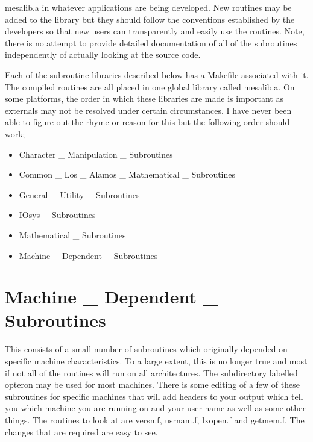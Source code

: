 \documentclass[onecolumn,letterpaper]{report}
\begin{document}
mesalib.a in whatever applications are being developed.  New routines may be added to 
the library but they should follow the conventions established by the developers so 
that new users can transparently and easily use the routines.  
Note, there is no attempt to provide detailed documentation of all of the subroutines 
independently of actually looking at the source code.
\par
Each of the subroutine libraries described below has a Makefile associated with it.  The 
compiled routines are all placed in one global library called mesalib.a.  On some
platforms, the order in which these libraries are made is important as externals may not
be resolved under certain circumstances.  I have never been able to figure out the
rhyme or reason for this but the following order should work;
\begin{itemize}
\item Character \_ Manipulation \_ Subroutines
\item  Common \_ Los \_ Alamos \_ Mathematical \_ Subroutines
\item General \_ Utility \_ Subroutines
\item IOsys \_ Subroutines
\item Mathematical \_ Subroutines 
\item Machine \_ Dependent \_ Subroutines
\end{itemize}
\section{Machine \_ Dependent \_ Subroutines}
This consists of a small number of subroutines which originally depended on 
specific machine characteristics.  To a large extent, this is no longer true and
most if not all of the routines will run on all architectures.  The subdirectory
labelled opteron may be used for most machines.  There is some editing of a few
of these subroutines for specific machines that will add headers to your output
which tell you which machine you are running on and your user name as well as some
other things.  The routines to look at are versn.f, usrnam.f, lxopen.f and getmem.f.
The changes that are required are easy to see.
\end{document}
